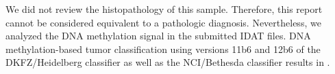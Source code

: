 We did not review the histopathology of this sample.
Therefore, this report cannot be considered equivalent to a pathologic diagnosis.
Nevertheless, we analyzed the DNA methylation signal in the submitted IDAT files.
DNA methylation-based tumor classification using versions 11b6 and 12b6 of the
DKFZ/Heidelberg classifier as well as the NCI/Bethesda classifier results in
.

